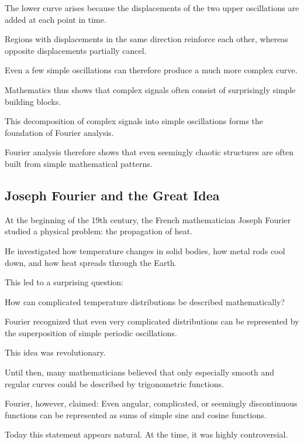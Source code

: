 The lower curve arises because
the displacements of the two upper oscillations
are added at each point in time.

Regions with displacements in the same direction reinforce each other,
whereas opposite displacements partially cancel.

Even a few simple oscillations
can therefore produce a much more complex curve.

Mathematics thus shows
that complex signals often consist of surprisingly simple building blocks.

This decomposition of complex signals
into simple oscillations
forms the foundation of Fourier analysis.

Fourier analysis therefore shows
that even seemingly chaotic structures
are often built from simple mathematical patterns.

\subsection{Joseph Fourier and the Great Idea}

At the beginning of the 19th century, the French mathematician
Joseph Fourier studied a physical problem:
the propagation of heat.

He investigated
how temperature changes in solid bodies,
how metal rods cool down,
and how heat spreads through the Earth.

This led to a surprising question:

\begin{NoteBox}
	\small
	\label{box:fourier-ausgangspunkt-waermeleitung}
	How can complicated temperature distributions be described mathematically?
\end{NoteBox}

Fourier recognized
that even very complicated distributions
can be represented by the superposition of simple periodic oscillations.

This idea was revolutionary.

Until then, many mathematicians believed
that only especially smooth and regular curves
could be described by trigonometric functions.

Fourier, however, claimed:
Even angular,
complicated,
or seemingly discontinuous functions
can be represented as sums of simple sine and cosine functions.

Today this statement appears natural.
At the time, it was highly controversial.

